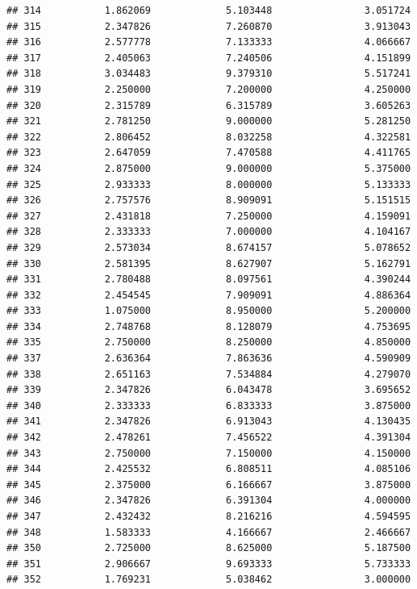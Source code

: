 \documentclass[]{article}
\begin{document}
\begin{verbatim}
## 314           1.862069             5.103448                3.051724
## 315           2.347826             7.260870                3.913043
## 316           2.577778             7.133333                4.066667
## 317           2.405063             7.240506                4.151899
## 318           3.034483             9.379310                5.517241
## 319           2.250000             7.200000                4.250000
## 320           2.315789             6.315789                3.605263
## 321           2.781250             9.000000                5.281250
## 322           2.806452             8.032258                4.322581
## 323           2.647059             7.470588                4.411765
## 324           2.875000             9.000000                5.375000
## 325           2.933333             8.000000                5.133333
## 326           2.757576             8.909091                5.151515
## 327           2.431818             7.250000                4.159091
## 328           2.333333             7.000000                4.104167
## 329           2.573034             8.674157                5.078652
## 330           2.581395             8.627907                5.162791
## 331           2.780488             8.097561                4.390244
## 332           2.454545             7.909091                4.886364
## 333           1.075000             8.950000                5.200000
## 334           2.748768             8.128079                4.753695
## 335           2.750000             8.250000                4.850000
## 337           2.636364             7.863636                4.590909
## 338           2.651163             7.534884                4.279070
## 339           2.347826             6.043478                3.695652
## 340           2.333333             6.833333                3.875000
## 341           2.347826             6.913043                4.130435
## 342           2.478261             7.456522                4.391304
## 343           2.750000             7.150000                4.150000
## 344           2.425532             6.808511                4.085106
## 345           2.375000             6.166667                3.875000
## 346           2.347826             6.391304                4.000000
## 347           2.432432             8.216216                4.594595
## 348           1.583333             4.166667                2.466667
## 350           2.725000             8.625000                5.187500
## 351           2.906667             9.693333                5.733333
## 352           1.769231             5.038462                3.000000

\end{verbatim}
\end{document}
